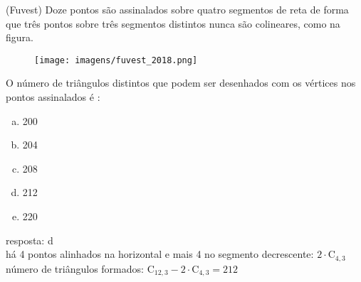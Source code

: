 \begin{ex}
  (Fuvest) Doze pontos são assinalados sobre quatro segmentos de reta de forma que três pontos sobre três segmentos distintos nunca são colineares, como na figura.
    \begin{figure} [!htb]
        \centering
        \texttt{[image: imagens/fuvest\_2018.png]}
    \end{figure}
  O número de triângulos distintos que podem ser desenhados com os vértices nos pontos assinalados é :
    \begin{enumerate}   [(a)]
        \item 200
        \item 204
        \item 208
        \item 212
        \item 220
    \end{enumerate}
      \begin{sol}
       resposta: d \\
       há 4 pontos alinhados na horizontal e mais 4 no segmento decrescente:\hspace{0,1cm} $2\cdot\mathrm{C}_{4,3}$ \\
       número de triângulos formados: $\mathrm{C}_{{12},3}-2\cdot\mathrm{C}_{4,3}=212$
      \end{sol}
 \end{ex}